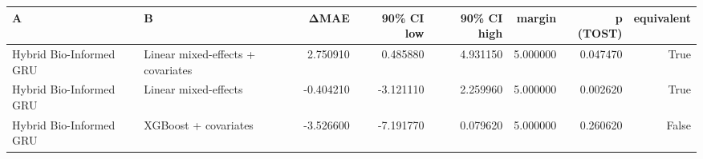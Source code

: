 \begin{tabular}{llrrrrrr}
\toprule
A & B & ΔMAE & 90\% CI low & 90\% CI high & margin & p (TOST) & equivalent \\
\midrule
Hybrid Bio-Informed GRU & Linear mixed-effects + covariates & 2.750910 & 0.485880 & 4.931150 & 5.000000 & 0.047470 & True \\
Hybrid Bio-Informed GRU & Linear mixed-effects & -0.404210 & -3.121110 & 2.259960 & 5.000000 & 0.002620 & True \\
Hybrid Bio-Informed GRU & XGBoost + covariates & -3.526600 & -7.191770 & 0.079620 & 5.000000 & 0.260620 & False \\
\bottomrule
\end{tabular}
